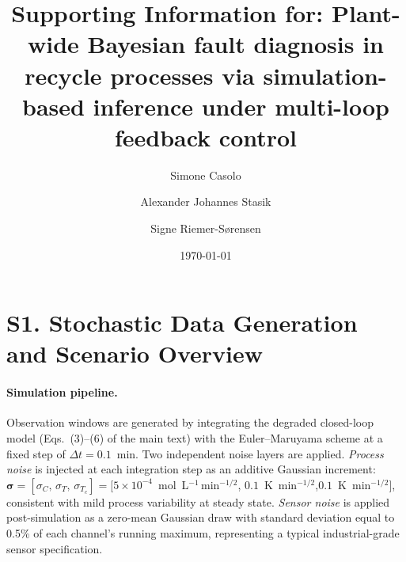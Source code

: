 \documentclass[aps,pre,twocolumn,superscriptaddress]{revtex4-2}
\begin{document}
\title{ Supporting Information for:
Plant-wide Bayesian fault diagnosis in recycle processes via simulation-based
inference under multi-loop feedback control
}

\author{Simone Casolo 
}

\author{Alexander Johannes Stasik }



\author{Signe Riemer-Sørensen
}

\date{\today}

\maketitle

\section*{S1.\; Stochastic Data Generation and Scenario Overview}
\label{sec:si_data_generation}

\paragraph{Simulation pipeline.}
Observation windows are generated by integrating the degraded closed-loop model
(Eqs.~(3)--(6) of the main text) with the Euler--Maruyama scheme at a fixed step
of $\Delta t = 0.1$~min.  Two independent noise layers are applied.  \emph{Process
noise} is injected at each integration step as an additive Gaussian increment:
$\boldsymbol{\sigma} = [\sigma_C,\,\sigma_T,\,\sigma_{T_c}] =
[5\times10^{-4}$~mol~L$^{-1}$\,min$^{-1/2}$,\;
$0.1$~K~min$^{-1/2}$,\;$0.1$~K~min$^{-1/2}]$,
consistent with mild process variability at steady state.  \emph{Sensor noise}
is applied post-simulation as a zero-mean Gaussian draw with standard deviation
equal to 0.5\% of each channel's running maximum, representing a typical
industrial-grade sensor specification.
\end{document}
